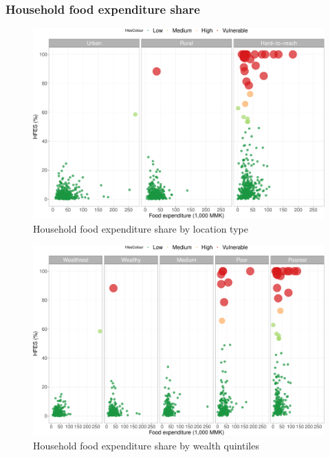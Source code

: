 \documentclass[12pt,a4paper]{article}
\begin{document}
\hypertarget{hfes-results}{%
\subsubsection{Household food expenditure share}\label{hfes-results}}

\begin{figure}[H]

{\centering \includegraphics{kayahReport_files/figure-latex/hfesScatterPlot1-1} 

}

\caption{Household food expenditure share by location type}\label{fig:hfesScatterPlot1}
\end{figure}

\begin{figure}[H]

{\centering \includegraphics{kayahReport_files/figure-latex/hfesScatterPlot2-1} 

}

\caption{Household food expenditure share by wealth quintiles}\label{fig:hfesScatterPlot2}
\end{figure}
\end{document}
